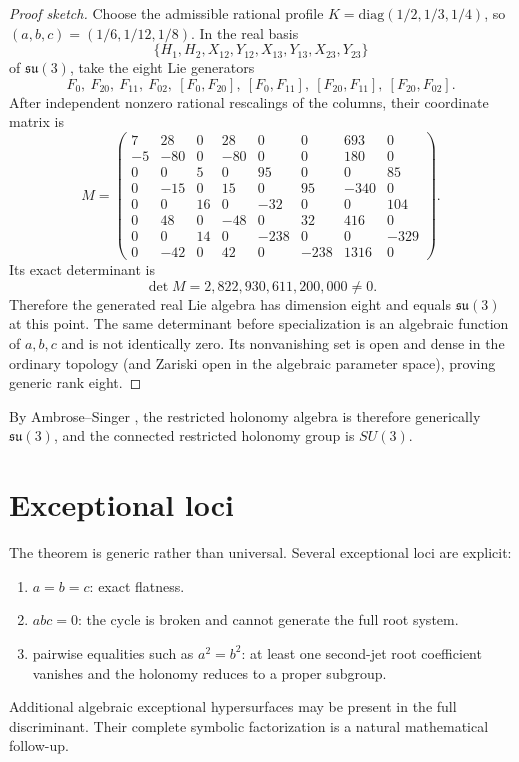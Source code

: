 \documentclass[11pt]{article}
\theoremstyle{remark}\newtheorem{remark}{Remark}
\begin{document}
\begin{proof}[Proof sketch]
Choose the admissible rational profile $K=\mathrm{diag}(1/2,1/3,1/4)$, so $(a,b,c)=(1/6,1/12,1/8)$. In the real basis
\[
\{H_1,H_2,X_{12},Y_{12},X_{13},Y_{13},X_{23},Y_{23}\}
\]
of $\mathfrak{su}(3)$, take the eight Lie generators
\[
F_0,\ F_{20},\ F_{11},\ F_{02},\ [F_0,F_{20}],\ [F_0,F_{11}],\ [F_{20},F_{11}],\ [F_{20},F_{02}].
\]
After independent nonzero rational rescalings of the columns, their coordinate matrix is
\[
M=\begin{pmatrix}
7&28&0&28&0&0&693&0\\
-5&-80&0&-80&0&0&180&0\\
0&0&5&0&95&0&0&85\\
0&-15&0&15&0&95&-340&0\\
0&0&16&0&-32&0&0&104\\
0&48&0&-48&0&32&416&0\\
0&0&14&0&-238&0&0&-329\\
0&-42&0&42&0&-238&1316&0
\end{pmatrix}.
\]
Its exact determinant is
\begin{equation}
\det M=2{,}822{,}930{,}611{,}200{,}000\ne0.
\end{equation}
Therefore the generated real Lie algebra has dimension eight and equals $\mathfrak{su}(3)$ at this point. The same determinant before specialization is an algebraic function of $a,b,c$ and is not identically zero. Its nonvanishing set is open and dense in the ordinary topology (and Zariski open in the algebraic parameter space), proving generic rank eight.
\end{proof}

By Ambrose--Singer \cite{AmbroseSinger1953}, the restricted holonomy algebra is therefore generically $\mathfrak{su}(3)$, and the connected restricted holonomy group is $SU(3)$.

\section{Exceptional loci}
The theorem is generic rather than universal. Several exceptional loci are explicit:
\begin{enumerate}[leftmargin=*]
\item $a=b=c$: exact flatness.
\item $abc=0$: the cycle is broken and cannot generate the full root system.
\item pairwise equalities such as $a^2=b^2$: at least one second-jet root coefficient vanishes and the holonomy reduces to a proper subgroup.
\end{enumerate}
Additional algebraic exceptional hypersurfaces may be present in the full discriminant. Their complete symbolic factorization is a natural mathematical follow-up.
\end{document}
